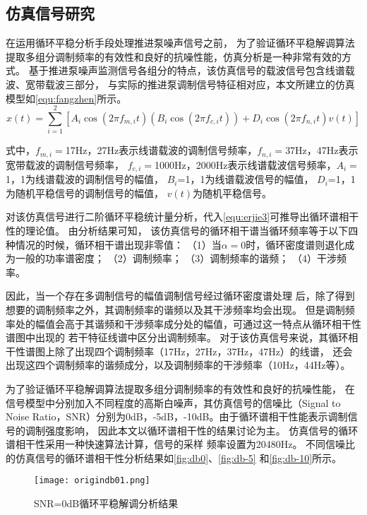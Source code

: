 \subsection{仿真信号研究}
在运用循环平稳分析手段处理推进泵噪声信号之前，
为了验证循环平稳解调算法提取多组分调制频率的有效性和良好的抗噪性能，仿真分析是一种非常有效的方
式。
基于推进泵噪声监测信号各组分的特点，该仿真信号的载波信号包含线谱载波、宽带载波三部分，
与实际的推进泵调制信号特征相对应，本文所建立的仿真模型如\autoref{equ:fangzhen}所示。 
\begin{equation}
    \label{equ:fangzhen}
    x\left ( t \right ) =\sum_{i=1}^{2}\left [ A_{i}\cos \left ( 2\pi f_{m,i}t  \right )\left ( B_{i}\cos\left ( 2\pi f_{c,i}t  \right )   \right )+D_{i}\cos\left ( 2\pi f_{n,i}t  \right )v\left ( t \right )      \right ]  
\end{equation}

式中，$f_{m,i}=$17Hz，27Hz表示线谱载波的调制信号频率，$f_{n,i}=$37Hz，47Hz表示宽带载波的调制信号频率，
$f_{c,i}=$1000Hz，2000Hz表示线谱载波信号频率，$A_i=$1，1为线谱载波的调制信号的幅值，
$B_i$=1，1为线谱载波信号的幅值，
$D_i$=1，1为随机平稳信号的调制信号的幅值，
$v\left ( t \right )$为随机平稳信号。

对该仿真信号进行二阶循环平稳统计量分析，代入\autoref{equ:erjie3}可推导出循环谱相干性的理论值。
由分析结果可知，
该仿真信号的循环相干谱当循环频率等于以下四种情况的时候，循环相干谱出现非零值：
（1）当$\alpha=0$时，循环密度谱则退化成为一般的功率谱密度；
（2）调制频率；
（3）调制频率的谐频；
（4）干涉频率。

因此，当一个存在多调制信号的幅值调制信号经过循环密度谱处理
后，除了得到想要的调制频率之外，其调制频率的谐频以及其干涉频率均会出现。
但是调制频率处的幅值会高于其谐频和干涉频率成分处的幅值，可通过这一特点从循环相干性谱图中出现的
若干特征线谱中区分出调制频率。
对于该仿真信号来说，其循环相干性谱图上除了出现四个调制频率（17Hz，27Hz，37Hz，47Hz）的线谱，
还会出现这四个调制频率的谐频成分，以及调制频率的干涉频率（10Hz，44Hz等）。

为了验证循环平稳解调算法提取多组分调制频率的有效性和良好的抗噪性能，
在信号模型中分别加入不同程度的高斯白噪声，其仿真信号的信噪比（Signal to Noise 
Ratio，SNR）分别为0dB，-5dB，-10dB。由于循环谱相干性能表示调制信号的调制强度影响，
因此本文以循环谱相干性的结果讨论为主。
仿真信号的循环谱相干性采用一种快速算法计算，信号的采样
频率设置为20480Hz。
不同信噪比的仿真信号的循环谱相干性分析结果如\autoref{fig:db0}、\autoref{fig:db-5}
和\autoref{fig:db-10}所示。
\begin{figure}[htbp]
    \centering
    \texttt{[image: origindb01.png]}
    \caption{\label{fig:db0}SNR=0dB循环平稳解调分析结果}
\end{figure}

